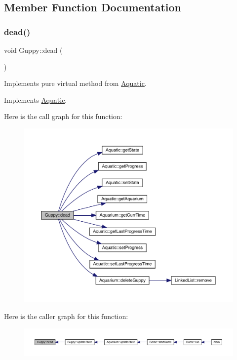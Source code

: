 \subsection{Member Function Documentation}
\mbox{\label{class_guppy_abcdcd74d4c3fdddfc5cc0439c0e512b7}} 
\subsubsection{\texorpdfstring{dead()}{dead()}}
{\footnotesize\ttfamily void Guppy\+::dead (\begin{DoxyParamCaption}{ }\end{DoxyParamCaption})\hspace{0.3cm}{\ttfamily [virtual]}}



Implements pure virtual method from \mbox{\hyperlink{class_aquatic}{Aquatic}}. 



Implements \mbox{\hyperlink{class_aquatic_a22fdb11e9cfec922fe50638709768276}{Aquatic}}.

Here is the call graph for this function\+:\nopagebreak
\begin{figure}[H]
\begin{center}
\leavevmode
\includegraphics[width=350pt]{class_guppy_abcdcd74d4c3fdddfc5cc0439c0e512b7_cgraph}
\end{center}
\end{figure}
Here is the caller graph for this function\+:\nopagebreak
\begin{figure}[H]
\begin{center}
\leavevmode
\includegraphics[width=350pt]{class_guppy_abcdcd74d4c3fdddfc5cc0439c0e512b7_icgraph}
\end{center}
\end{figure}
\mbox{\label{class_guppy_a356d1f45f52684bba3e6e9e7774e59b8}} 
